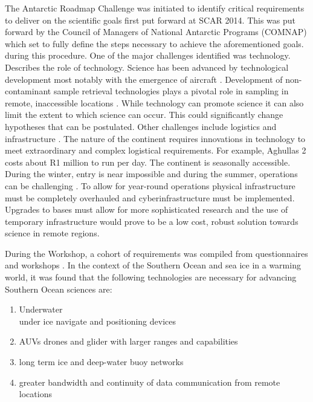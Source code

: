 The Antarctic Roadmap Challenge was initiated to identify critical requirements to deliver on the scientific goals first put forward at SCAR 2014\cite{kennicutt2016delivering}. This was put forward by the Council of Managers of National Antarctic Programs (COMNAP) which set to fully define the steps necessary to achieve the aforementioned goals. during this procedure. One of the major challenges identified was technology. \textcite{kennicutt2016delivering} Describes the role of technology. Science has been advanced by technological development most notably with the emergence of aircraft \cite{kennicutt2016delivering}. Development of non-contaminant sample retrieval technologies plays a pivotal role in sampling in remote, inaccessible locations \cite{kennicutt2016delivering}. While technology can promote science it can also limit the extent to which science can occur. This could significantly change hypotheses that can be postulated. Other challenges include logistics and infrastructure \cite{kennicutt2016delivering}. The nature of the continent requires innovations in technology to meet extraordinary and complex logistical requirements. For example, Aghullas 2 costs about R1 million to run per day. The continent is seasonally accessible. During the winter, entry is near impossible and during the summer, operations can be challenging \cite{kennicutt2016delivering}. To allow for year-round operations physical infrastructure must be completely overhauled and cyberinfrastructure must be implemented. Upgrades to bases must allow for more sophisticated research and the use of temporary infrastructure would prove to be a low cost, robust solution towards science in remote regions. \par
During the Workshop, a cohort of requirements was compiled from questionnaires and workshops \cite{kennicutt2016delivering}. In the context of the Southern Ocean and sea ice in a warming world, it was found that the following technologies are necessary for advancing Southern Ocean sciences are\cite{kennicutt2016delivering}:
\begin{enumerate}
    \item Underwater\\under ice navigate and positioning devices
    \item AUVs drones and glider with larger ranges and capabilities
    \item long term ice and deep-water buoy networks
    \item greater bandwidth and continuity of data communication from remote locations 
\end{enumerate}

